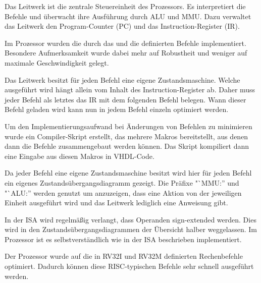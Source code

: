 Das Leitwerk ist die zentrale Steuereinheit des Prozessors. Es interpretiert
die Befehle und \"uberwacht ihre Ausf\"uhrung durch ALU und MMU. Dazu verwaltet
das Leitwerk den Program-Counter (PC) und das Instruction-Register (IR).

Im Prozessor wurden die durch das 
und die  definierten Befehle implementiert. Besondere Aufmerksamkeit wurde dabei mehr auf Robustheit und
weniger auf maximale Geschwindigkeit gelegt.

Das Leitwerk besitzt f\"ur jeden Befehl eine eigene Zustandsmaschine. Welche
ausgef\"uhrt wird h\"angt allein vom Inhalt des Instruction-Register ab. Daher
muss jeder Befehl als letztes das IR mit dem folgenden Befehl belegen. Wann
dieser Befehl geladen wird kann nun in jedem Befehl einzeln optimiert werden.

Um den Implementierungsaufwand bei \"Anderungen von Befehlen zu minimieren
wurde ein Compiler-Skript erstellt, das mehrere Makros bereitstellt, aus denen
dann die Befehle zusammengebaut werden k\"onnen. Das Skript kompiliert dann
eine Eingabe aus diesen Makros in VHDL-Code.

Da jeder Befehl eine eigene Zustandsmaschine besitzt wird hier f\"ur jeden
Befehl ein eigenes Zustands\-\"uber\-gangs\-dia\-gramm gezeigt. Die Pr\"afixe
"`MMU:'' und "`ALU:'' werden genutzt um anzuzeigen, dass eine Aktion von der
jeweiligen Einheit ausgef\"uhrt wird und das Leitwerk lediglich eine Anweisung
gibt.

In der ISA wird regelm\"a\ss{}ig verlangt, dass Operanden sign-extended werden.
Dies wird in den Zustands\-\"uber\-gangs\-dia\-grammen der \"Ubersicht halber
weggelassen. Im Prozessor ist es selbstverst\"andlich wie in der ISA
beschrieben implementiert.

Der Prozessor wurde auf die in RV32I und RV32M definierten Rechenbefehle
optimiert. Dadurch k\"onnen diese RISC-typischen Befehle sehr schnell
ausgef\"uhrt werden.


